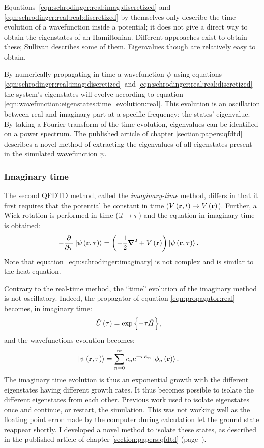 Equations~\eqref{eqn:schrodinger:real:imag:discretized} and
\eqref{eqn:schrodinger:real:real:discretized} by themselves only describe the
time evolution of a wavefunction inside a potential; it does not give a direct
way to obtain the eigenstates of an Hamiltonian. Different approaches exist to
obtain these; Sullivan describes some of them. Eigenvalues though are
relatively easy to obtain.

By numerically propagating in time a wavefunction $\psi$ using equations
\eqref{eqn:schrodinger:real:imag:discretized} and
\eqref{eqn:schrodinger:real:real:discretized} the system's eigenstates will
evolve according to equation
\eqref{eqn:wavefunction:eigenstates:time_evolution:real}. This evolution is an
oscillation between real and imaginary part at a specific frequency; the states'
eigenvalue. By taking a Fourier transform of the time evolution, eigenvalues
can be identified on a power spectrum. The published article of chapter
\ref{section:papers:qfdtd} describes a novel method of extracting the
eigenvalues of all eigenstates present in the simulated wavefunction $\psi$.



\subsubsection{Imaginary time}

The second QFDTD method, called the \textit{imaginary-time} method, differs in
that it first requires that the potential be constant in time
($V\left( \textbf{r}, t \right) \rightarrow V\left( \textbf{r} \right)$).
Further, a Wick rotation is performed in time ($\textrm{i} t \rightarrow \tau$)
and the \schrodinger equation in imaginary time is
obtained:
\begin{align}
- \frac{\partial^{{}} }{\partial {\tau}^{{}}} \left| \psi\left( \textbf{r}, \tau \right) \right>
    & = \left( -\frac{1}{2} \bm{\nabla}^2 + V\left( \textbf{r} \right)  \right) \left| \psi\left( \textbf{r}, \tau \right) \right>.
\label{eqn:schrodinger:imaginary}
\end{align}
Note that equation~\eqref{eqn:schrodinger:imaginary} is not complex and is
similar to the heat equation.


Contrary to the real-time method, the ``time'' evolution of the imaginary
method is not oscillatory. Indeed, the propagator of equation
\eqref{eqn:propagator:real} becomes, in imaginary time:
\begin{align}
\hat{U}\left( \tau \right) & = \exp{ \left\{  - \tau  \hat{H} \right\}} \label{eqn:propagator:imag},
\end{align}
and the wavefunctions evolution becomes:
\begin{align}
\left| \psi\left( \textbf{r}, \tau \right) \right>
 & = \sum_{n=0}^{\infty} c_n \textrm{e}^{ - \tau E_n } \left| \phi_n\left( \textbf{r} \right) \right>.
\end{align}
The imaginary time evolution is thus an exponential growth with the different
eigenstates having different growth rates. It thus becomes possible to isolate
the different eigenstates from each other. Previous work used to isolate
eigenstates once and continue, or restart, the simulation. This was not working
well as the floating point error made by the computer during calculation let
the ground state reappear shortly. I developed a novel method to isolate these
states, as described in the published article of chapter
\ref{section:papers:qfdtd} (page~\pageref{section:papers:qfdtd}).

